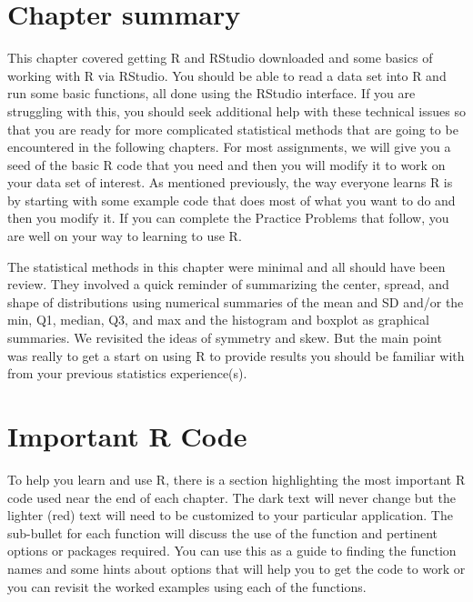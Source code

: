 \documentclass[]{book}
\begin{document}
\section{Chapter summary}\label{chapter-summary}

This chapter covered getting R and RStudio downloaded and some basics of
working with R via RStudio. You should be able to read a data set into R
and run some basic functions, all done using the RStudio interface. If
you are struggling with this, you should seek additional help with these
technical issues so that you are ready for more complicated statistical
methods that are going to be encountered in the following chapters. For
most assignments, we will give you a seed of the basic R code that you
need and then you will modify it to work on your data set of interest.
As mentioned previously, the way everyone learns R is by starting with
some example code that does most of what you want to do and then you
modify it. If you can complete the Practice Problems that follow, you
are well on your way to learning to use R.

The statistical methods in this chapter were minimal and all should have
been review. They involved a quick reminder of summarizing the center,
spread, and shape of distributions using numerical summaries of the mean
and SD and/or the min, Q1, median, Q3, and max and the histogram and
boxplot as graphical summaries. We revisited the ideas of symmetry and
skew. But the main point was really to get a start on using R to provide
results you should be familiar with from your previous statistics
experience(s).

\section{Important R Code}\label{important-r-code}

To help you learn and use R, there is a section highlighting the most
important R code used near the end of each chapter. The dark text will
never change but the lighter (red) text will need to be customized to
your particular application. The sub-bullet for each function will
discuss the use of the function and pertinent options or packages
required. You can use this as a guide to finding the function names and
some hints about options that will help you to get the code to work or
you can revisit the worked examples using each of the functions.
\end{document}

